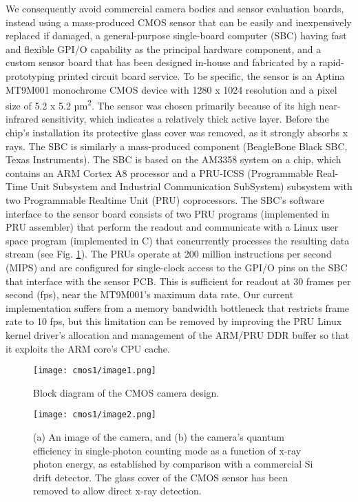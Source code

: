 We consequently avoid commercial camera bodies and sensor evaluation
boards, instead using a mass-produced CMOS sensor that can be easily and
inexpensively replaced if damaged, a general-purpose single-board
computer (SBC) having fast and flexible GPI/O capability as the
principal hardware component, and a custom sensor board that has been
designed in-house and fabricated by a rapid-prototyping printed circuit
board service. To be specific, the sensor is an Aptina MT9M001
monochrome CMOS device with 1280 x 1024 resolution and a pixel size of
5.2 x 5.2 µm\textsuperscript{2}. The sensor was chosen primarily because
of its high near-infrared sensitivity, which indicates a relatively
thick active layer. Before the chip's installation its protective glass
cover was removed, as it strongly absorbs x rays. The SBC is similarly a
mass-produced component (BeagleBone Black SBC, Texas Instruments). The
SBC is based on the AM3358 system on a chip, which contains an ARM
Cortex A8 processor and a PRU-ICSS (Programmable Real-Time Unit
Subsystem and Industrial Communication SubSystem) subsystem with two
Programmable Realtime Unit (PRU) coprocessors. The SBC's software
interface to the sensor board consists of two PRU programs (implemented
in PRU assembler) that perform the readout and communicate with a Linux
user space program (implemented in C) that concurrently processes the
resulting data stream (see Fig. \ref{cm1image1}). The PRUs operate at 200 million
instructions per second (MIPS) and are configured for single-clock
access to the GPI/O pins on the SBC that interface with the sensor PCB.
This is sufficient for readout at 30 frames per second (fps), near the
MT9M001's maximum data rate. Our current implementation suffers from a
memory bandwidth bottleneck that restricts frame rate to 10 fps, but
this limitation can be removed by improving the PRU Linux kernel
driver's allocation and management of the ARM/PRU DDR buffer so that it
exploits the ARM core's CPU cache.

\begin{figure}[h] \label{cm1image1}
\caption{ Block diagram of the CMOS camera design.}
\centering
{}\texttt{[image: cmos1/image1.png]}
\end{figure}

\begin{figure}[h] \label{cm1image2}
\caption{ (a) An image of the camera,
and (b) the camera's quantum efficiency in single-photon counting mode
as a function of x-ray photon energy, as established by comparison with
a commercial Si drift detector. The glass cover of the CMOS sensor has
been removed to allow direct x-ray detection.}
\centering
\texttt{[image: cmos1/image2.png]}
\end{figure}

